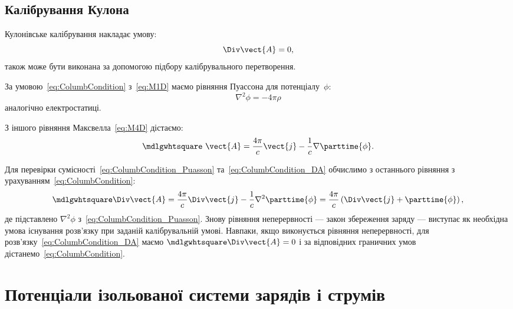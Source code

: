 \subsection*{Калібрування Кулона}

Кулонівське калібрування накладає умову:
\begin{equation}\label{eq:ColumbCondition}
	\Div \vect{A} = 0,
\end{equation}
також може бути виконана за допомогою підбору калібрувального
перетворення.

За умовою~\eqref{eq:ColumbCondition} з~\eqref{eq:M1D} маємо рівняння Пуассона для потенціалу~$\phi$:
\begin{equation}\label{eq:ColumbCondition_Puasson}
	\nabla^2 \phi = -4\pi \rho
\end{equation}
аналогічно електростатиці.

З іншого рівняння Максвелла~\eqref{eq:M4D} дістаємо:
\begin{equation}\label{eq:ColumbCondition_DA}
	\mdlgwhtsquare\ \vect{A} = \frac{4\pi}c \vect{j} - \frac1c \nabla \parttime{\phi}.
\end{equation}

Для перевірки сумісності~\eqref{eq:ColumbCondition_Puasson} та~\eqref{eq:ColumbCondition_DA} обчислимо з останнього рівняння з
урахуванням~\eqref{eq:ColumbCondition}:
\begin{equation*}
	\mdlgwhtsquare\Div\vect{A} = \frac{4\pi}c \Div\vect{j} - \frac1c \nabla^2 \parttime{\phi} = \frac{4\pi}c\left( \Div\vect{j} +
	\parttime{\phi}\right),
\end{equation*}
де підставлено $\nabla^2\phi$ з~\eqref{eq:ColumbCondition_Puasson}. Знову рівняння неперервності --- закон збереження
заряду --- виступає як необхідна умова існування розв’язку при заданій
калібрувальній умові. Навпаки, якщо виконується рівняння неперервності, для
розв’язку~\eqref{eq:ColumbCondition_DA} маємо $\mdlgwhtsquare\Div\vect{A} = 0$ і за відповідних граничних умов
дістанемо~\eqref{eq:ColumbCondition}.

\section{Потенціали ізольованої системи зарядів і струмів}\label{sec:Potentials_of_isolated_system}



